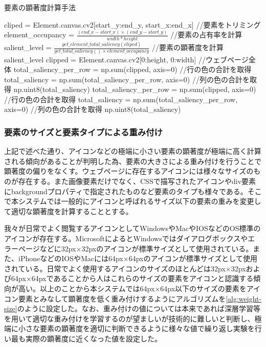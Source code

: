 \begin{algorithm}[H]
  \small
  \caption{要素の顕著度計算手法}
  \label{alg:element_saliency}
  \begin{algorithmic}
    \State cliped = Element.canvas.cv2[start\_y:end\_y, start\_x:end\_x] //要素をトリミング
    \State element\_occupancy = $\frac{(end\_x - start\_x) \times (end\_y - start\_y)}{width * height}$ //要素の占有率を計算
    \State salient\_level = $\frac{get\_element\_total\_saliency(cliped)}{get\_total\_saliency() \times element\_occupancy}$ //要素の顕著度を計算
    \State \Return salient\_level
  \Else
    \State {}
  \EndIf
  \EndFunction
  \State
    \State clipped = Element.canvas.cv2[0:height, 0:width] //ウェブページ全体
    \State total\_saliency\_per\_row = np.sum(clipped, axis=0) //行の色の合計を取得
    \State total\_saliency = np.sum(total\_saliency\_per\_row, axis=0) //列の色の合計を取得
    \State \Return np.uint8(total\_saliency)
  \EndFunction
  \State
    \State total\_saliency\_per\_row = np.sum(clipped, axis=0) //行の色の合計を取得
    \State total\_saliency = np.sum(total\_saliency\_per\_row, axis=0) //列の色の合計を取得
    \State \Return np.uint8(total\_saliency)
  \EndFunction
  \end{algorithmic}
\end{algorithm}

\subsubsection{要素のサイズと要素タイプによる重み付け}\label{subsec:system03-1}
\par 上記で述べた通り、アイコンなどの極端に小さい要素の顕著度が極端に高く計算される傾向があることが判明した為、要素の大きさによる重み付けを行うことで顕著度の偏りをなくす。ウェブページに存在するアイコンには様々なサイズのものが存在する。また画像要素だけでなく、CSSで描写されたアイコンやdiv要素にbackgroundプロパティで指定されたものなど要素のタイプも様々である。そこで本システムでは一般的にアイコンと呼ばれるサイズ以下の要素の重みを変更して適切な顕著度を計算することとする。

\par 我々が日常でよく閲覧するアイコンとしてWindowsやMacやIOSなどのOS標準のアイコンが存在する。MicrosoftによるとWindowsではダイアログボックスやエラーページなどに32px$\times$32pxのアイコンが標準サイズとして使用されている\cite{windowsicon}。また、iPhoneなどのIOSやMacには64px$\times$64pxのアイコンが標準サイズとして使用されている\cite{appleicon}。日常でよく使用するアイコンのサイズのほとんどは32px$\times$32pxおよび64px$\times$64pxであることから人はこれらのサイズの要素をアイコンと認識する傾向が高い。以上のことから本システムでは64px$\times$64px以下のサイズの要素をアイコン要素とみなして顕著度を低く重み付けするようにアルゴリズムを\ref{alg:weight-size}のように設定した。なお、重み付けの値については本来であれば深層学習等を用いて適切な重み付けを学習するのが望ましいが技術的に難しいと判断し、極端に小さな要素の顕著度を適切に判断できるように様々な値で繰り返し実験を行い最も実際の顕著度に近くなった値を設定した。

